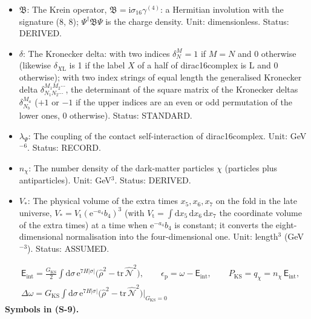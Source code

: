 \documentclass[
  10pt,
]{article}
\begin{document}
\begin{itemize}
  states, its adjoint with respect to the scalar product of that space
  (for the quantised dirac16complex the indefinite Krein scalar
  product). Status: STANDARD.
\item
  \(\mathfrak{B}\): The Krein operator,
  \(\mathfrak{B} = \mathrm{i}\sigma_{16}\gamma^{(4)}\): a Hermitian
  involution with the signature (8, 8); \(\Psi^\dagger\mathfrak{B}\Psi\)
  is the charge density. Unit: dimensionless. Status: DERIVED.
\item
  \(\delta\): The Kronecker delta: with two indices \(\delta^M_N = 1\)
  if \(M = N\) and 0 otherwise (likewise \(\delta_{X\mathrm{L}}\) is 1
  if the label \(X\) of a half of dirac16complex is L and 0 otherwise);
  with two index strings of equal length the generalised Kronecker delta
  \(\delta^{M_1M_2\cdots}_{N_1N_2\cdots}\), the determinant of the
  square matrix of the Kronecker deltas \(\delta^{M_a}_{N_b}\) (\(+1\)
  or \(-1\) if the upper indices are an even or odd permutation of the
  lower ones, 0 otherwise). Status: STANDARD.
\item
  \(\lambda_\Psi\): The coupling of the contact self-interaction of
  dirac16complex. Unit: GeV\(^{-6}\). Status: RECORD.
\item
  \(n_\chi\): The number density of the dark-matter particles \(\chi\)
  (particles plus antiparticles). Unit: GeV\(^3\). Status: DERIVED.
\item
  \(V_*\): The physical volume of the extra times \(x_5, x_6, x_7\) on
  the fold in the late universe,
  \(V_* = V_{\mathrm{t}}(\mathrm{e}^{-a_4}b_4)^3\) (with
  \(V_{\mathrm{t}} = \int\mathrm{d}x_5\,\mathrm{d}x_6\,\mathrm{d}x_7\)
  the coordinate volume of the extra times) at a time when
  \(\mathrm{e}^{-a_4}b_4\) is constant; it converts the
  eight-dimensional normalisation into the four-dimensional one. Unit:
  length\(^3\) (GeV\(^{-3}\)). Status: ASSUMED.
\end{itemize}

\[
\begin{aligned}
&\mathsf{E}_{\mathrm{int}} = \frac{G_{\mathrm{KS}}}{2}\int\mathrm{d}\sigma\,\mathrm{e}^{7H\lvert\sigma\rvert}\Big(\hat\rho^2 - \mathrm{tr}\,\hat{\mathcal{N}}^2\Big),\qquad
 \epsilon_{\mathrm{p}} = \omega - \mathsf{E}_{\mathrm{int}},\qquad P_{\mathrm{KS}} = q_\chi = n_\chi\,\mathsf{E}_{\mathrm{int}},\\
&\Delta\omega = G_{\mathrm{KS}}\int\mathrm{d}\sigma\,\mathrm{e}^{7H\lvert\sigma\rvert}\Big(\hat\rho^2 - \mathrm{tr}\,\hat{\mathcal{N}}^2\Big)\Big\vert_{G_{\mathrm{KS}} = 0}
\end{aligned} \tag{S-9}
\] \textbf{Symbols in (S-9).}
\end{document}
